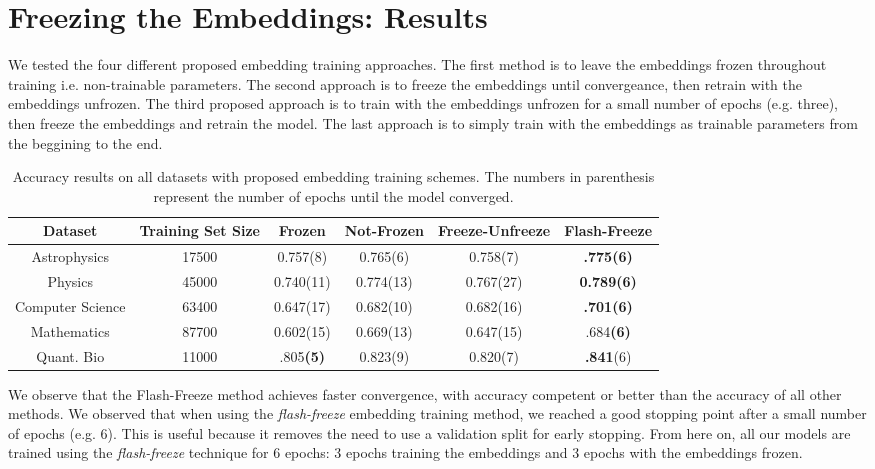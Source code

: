 \section{Freezing the Embeddings: Results}
We tested the four different proposed embedding training approaches.
The first method is to leave the embeddings frozen throughout training i.e. non-trainable parameters.
The second approach is to freeze the embeddings until convergeance, then retrain with the embeddings unfrozen.
The third proposed approach is to train with the embeddings unfrozen for a small number of epochs (e.g. three), then
freeze the embeddings and retrain the model.
The last approach is to simply train with the embeddings as trainable parameters from the beggining to the end.

\begin{center}\begin{table}[H]\begin{tabular}{||c c c c c c ||}
 \hline
 Dataset & Training Set Size & Frozen & Not-Frozen & Freeze-Unfreeze & Flash-Freeze\\ [0.5ex]
 \hline\hline
Astrophysics & 17500 & 0.757(8) & 0.765(6) & 0.758(7) & \textbf{.775(6)}\\
Physics &  45000 & 0.740(11) & 0.774(13) & 0.767(27) & \textbf{0.789(6)}\\
Computer Science & 63400 & 0.647(17) & 0.682(10) & 0.682(16) & \textbf{.701(6)}\\
Mathematics & 87700 & 0.602(15) & 0.669(13) & 0.647(15) & .684\textbf{(6)}\\
Quant. Bio & 11000 & .805\textbf{(5)} & 0.823(9) & 0.820(7) & \textbf{.841}(6)\\
 [1ex]\hline\end{tabular}\caption{Accuracy results on all datasets with proposed embedding training schemes.
 The numbers in parenthesis represent the number of epochs until the model converged.}
\end{table}\end{center}

We observe that the Flash-Freeze method achieves faster convergence, with accuracy competent or better than
the accuracy of all other methods. We observed that when using the \textit{flash-freeze} embedding training method, we reached a
good stopping point after a small number of epochs (e.g. 6). This is useful because it removes the need to use a validation split for early
stopping. From here on, all our models are trained using the \textit{flash-freeze} technique for 6 epochs: 3 epochs training the embeddings and 3 epochs
with the embeddings frozen.

